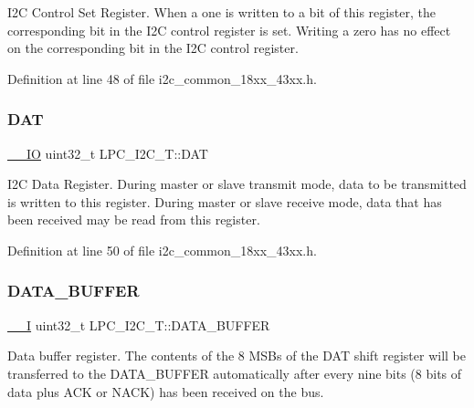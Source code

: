I2C Control Set Register. When a one is written to a bit of this register, the corresponding bit in the I2C control register is set. Writing a zero has no effect on the corresponding bit in the I2C control register. 

Definition at line 48 of file i2c\+\_\+common\+\_\+18xx\+\_\+43xx.\+h.

\mbox{\label{struct_l_p_c___i2_c___t_ab3babd27c9d202c1fefce13d5498d473}} 
\subsubsection{\texorpdfstring{D\+AT}{DAT}}
{\footnotesize\ttfamily \hyperlink{core__sc300_8h_aec43007d9998a0a0e01faede4133d6be}{\+\_\+\+\_\+\+IO} uint32\+\_\+t L\+P\+C\+\_\+\+I2\+C\+\_\+\+T\+::\+D\+AT}

I2C Data Register. During master or slave transmit mode, data to be transmitted is written to this register. During master or slave receive mode, data that has been received may be read from this register. 

Definition at line 50 of file i2c\+\_\+common\+\_\+18xx\+\_\+43xx.\+h.

\mbox{\label{struct_l_p_c___i2_c___t_a63283a528320f69703f42fcc919ab4bc}} 
\subsubsection{\texorpdfstring{D\+A\+T\+A\+\_\+\+B\+U\+F\+F\+ER}{DATA\_BUFFER}}
{\footnotesize\ttfamily \hyperlink{core__sc300_8h_af63697ed9952cc71e1225efe205f6cd3}{\+\_\+\+\_\+I} uint32\+\_\+t L\+P\+C\+\_\+\+I2\+C\+\_\+\+T\+::\+D\+A\+T\+A\+\_\+\+B\+U\+F\+F\+ER}

Data buffer register. The contents of the 8 M\+S\+Bs of the D\+AT shift register will be transferred to the D\+A\+T\+A\+\_\+\+B\+U\+F\+F\+ER automatically after every nine bits (8 bits of data plus A\+CK or N\+A\+CK) has been received on the bus. 

